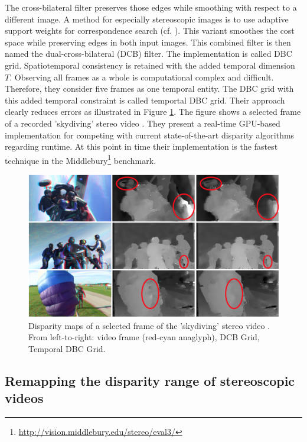 The cross-bilateral filter preserves those edges while smoothing with respect to a different image.
A method for especially stereoscopic images is to use adaptive support weights for correspondence search (cf. \citep{yoon2006adaptive}).
This variant smoothes the cost space while preserving edges in both input images.
This combined filter is then named the dual-cross-bilateral (DCB) filter.
The implementation is called DBC grid.
Spatiotemporal consistency is retained with the added temporal dimension $T$.
Observing all frames as a whole is computational complex and difficult.
Therefore, they consider five frames as one temporal entity.
The DBC grid with this added temporal constraint is called temportal DBC grid.
Their approach clearly reduces errors as illustrated in Figure \ref{fig:dbcgrid}.
The figure shows a selected frame of a recorded 'skydiving' stereo video \citep{richardt2010real}.
\newline\newline\noindent They present a real-time GPU-based implementation for competing with current state-of-the-art disparity algorithms regarding runtime.
At this point in time their implementation is the fastest technique in the Middlebury\footnote{\url{http://vision.middlebury.edu/stereo/eval3/}} benchmark.

\begin{figure}[h!]
  \centering
  \includegraphics[width=1.0\textwidth]{src/images/dbcgrid.png}
  \caption[Examples of disparity maps]{Disparity maps of a selected frame of the 'skydiving' stereo video \citep{richardt2010real}. From left-to-right: video frame (red-cyan anaglyph), DCB Grid, Temporal DBC Grid.}
  \label{fig:dbcgrid}
\end{figure}

\subsection{Remapping the disparity range of stereoscopic videos}

